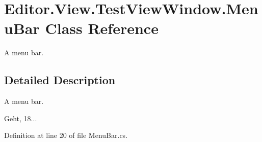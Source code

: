 \section{Editor.\-View.\-Test\-View\-Window.\-Menu\-Bar Class Reference}
\label{class_editor_1_1_view_1_1_test_view_window_1_1_menu_bar}


A menu bar.  




\subsection{Detailed Description}
A menu bar. 

Geht, 18... 

Definition at line 20 of file Menu\-Bar.\-cs.

